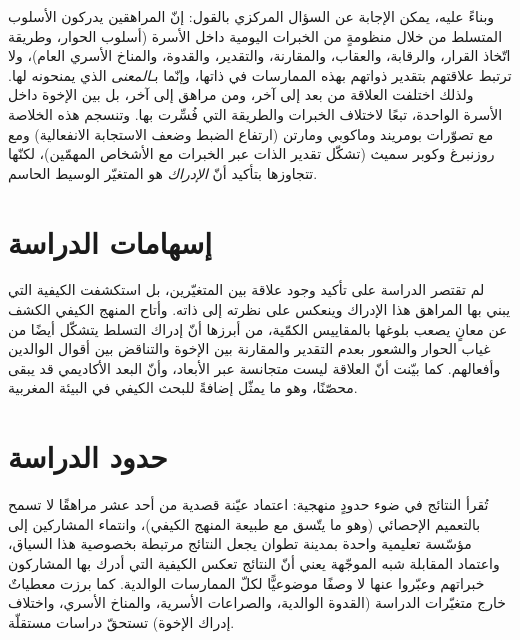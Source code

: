 \documentclass[12pt,oneside]{report}
\begin{document}
وبناءً عليه، يمكن الإجابة عن السؤال المركزي بالقول: إنّ المراهقين يدركون الأسلوب المتسلط من خلال
منظومةٍ من الخبرات اليومية داخل الأسرة (أسلوب الحوار، وطريقة اتّخاذ القرار، والرقابة، والعقاب،
والمقارنة، والتقدير، والقدوة، والمناخ الأسري العام)، ولا ترتبط علاقتهم بتقدير ذواتهم بهذه
الممارسات في ذاتها، وإنّما بـ\emph{المعنى} الذي يمنحونه لها. ولذلك اختلفت العلاقة من بعد إلى آخر،
ومن مراهق إلى آخر، بل بين الإخوة داخل الأسرة الواحدة، تبعًا لاختلاف الخبرات والطريقة التي فُسِّرت
بها. وتنسجم هذه الخلاصة مع تصوّرات بومريند وماكوبي ومارتن (ارتفاع الضبط وضعف الاستجابة
الانفعالية) ومع روزنبرغ وكوبر سميث (تشكّل تقدير الذات عبر الخبرات مع الأشخاص المهمّين)، لكنّها
تتجاوزها بتأكيد أنّ \emph{الإدراك} هو المتغيّر الوسيط الحاسم.

\section{إسهامات الدراسة}
لم تقتصر الدراسة على تأكيد وجود علاقة بين المتغيّرين، بل استكشفت الكيفية التي يبني بها المراهق
هذا الإدراك وينعكس على نظرته إلى ذاته. وأتاح المنهج الكيفي الكشف عن معانٍ يصعب بلوغها بالمقاييس
الكمّية، من أبرزها أنّ إدراك التسلط يتشكّل أيضًا من غياب الحوار والشعور بعدم التقدير والمقارنة بين
الإخوة والتناقض بين أقوال الوالدين وأفعالهم. كما بيّنت أنّ العلاقة ليست متجانسة عبر الأبعاد، وأنّ
البعد الأكاديمي قد يبقى محصّنًا، وهو ما يمثّل إضافةً للبحث الكيفي في البيئة المغربية.

\section{حدود الدراسة}
تُقرأ النتائج في ضوء حدودٍ منهجية: اعتماد عيّنة قصدية من أحد عشر مراهقًا لا تسمح بالتعميم
الإحصائي (وهو ما يتّسق مع طبيعة المنهج الكيفي)، وانتماء المشاركين إلى مؤسّسة تعليمية واحدة بمدينة
تطوان يجعل النتائج مرتبطة بخصوصية هذا السياق، واعتماد المقابلة شبه الموجّهة يعني أنّ النتائج تعكس
الكيفية التي أدرك بها المشاركون خبراتهم وعبّروا عنها لا وصفًا موضوعيًّا لكلّ الممارسات الوالدية.
كما برزت معطياتٌ خارج متغيّرات الدراسة (القدوة الوالدية، والصراعات الأسرية، والمناخ الأسري،
واختلاف إدراك الإخوة) تستحقّ دراسات مستقلّة.
\end{document}
